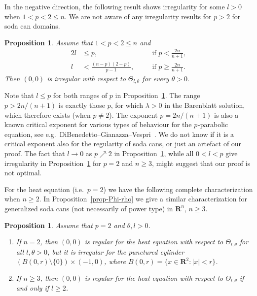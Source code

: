 \documentclass[a4paper, twoside]{article}
\theoremstyle{propositional}
\newtheorem{prop}[thm]{Proposition}
\theoremstyle{descriptive}
\numberwithin{equation}{section}
\newcommand{\R}{\mathbf{R}}
\newcommand{\Rn}{\mathbf{R}^n}
\newcommand{\p}{{$p\mspace{1mu}$}}
\newcommand{\setm}{\setminus}
\newcommand{\la}{\lambda}
\begin{document}
In the negative direction, the following result shows
irregularity for some $l>0$ when
$1<p<2\le n$.  
We are not aware of any irregularity results for $p>2$ for 
soda can domains.


\begin{prop} \label{prop-soda-irreg}
Assume that $1<p<2\le n$ and 
\begin{alignat*}{2}
l &\le p, &\quad&  \text{if }p<\frac{2n}{n+1}, \\
    l &< \frac{(n-p)(2-p)}{p-1},
    &\quad & \text{if } p \ge  \frac{2n}{n+1}.
\end{alignat*}
Then $(0,0)$  is irregular with respect to 
$\Theta_{l,\theta}$  for every $\theta>0$.
\end{prop}

Note that $l \le p$ for both ranges of $p$ in Proposition~\ref{prop-soda-irreg}.
The range $p>2n/(n+1)$ is exactly those $p$,
for which $\la>0$ in the Barenblatt solution, which therefore exists (when $p \ne 2$).
The exponent $p=2n/(n+1)$ is also a known critical exponent
for various types of behaviour for the \p-parabolic equation,
see e.g.\ DiBenedetto--Gianazza--Vespri~\cite[Section~6.21.4]{DiBenGianVesp12}.
We do not know if it is a critical exponent also
for the regularity of soda cans, or just an artefact of our proof.
The fact that $l\to0$ as $p\nearrow2$ in Proposition~\ref{prop-soda-irreg},
while all $0<l<p$ give irregularity in Proposition~\ref{prop-irreg-EG} 
for $p=2$ and $n \ge 3$, might suggest
that our proof is not optimal.


For the heat equation (i.e.\ $p=2$) we have
the following complete characterization when $n \ge 2$.
In Proposition~\ref{prop-Phi-rho}
we give a similar characterization for generalized soda cans
(not necessarily of power type) in $\Rn$, $n \ge 3$.

\begin{prop}  \label{prop-irreg-EG}
Assume that $p=2$  and $\theta,l>0$.
\begin{enumerate}
\item \label{reg-n=2}
If $n=2$, then $(0,0)$  is regular for the heat equation with respect to 
$\Theta_{l,\theta}$  for all $l,\theta>0$, but it is  irregular for 
the punctured cylinder $(B(0,r)\setm\{0\}) \times (-1,0)$,
where $B(0,r)=\{x \in \R^2 : |x|<r\}$.
\item \label{reg-n>=3}
If $n \ge 3$, then $(0,0)$  is regular for the heat equation with respect to 
$\Theta_{l,\theta}$  if and only if $l \ge 2$.
\end{enumerate}
\end{prop}
\end{document}
